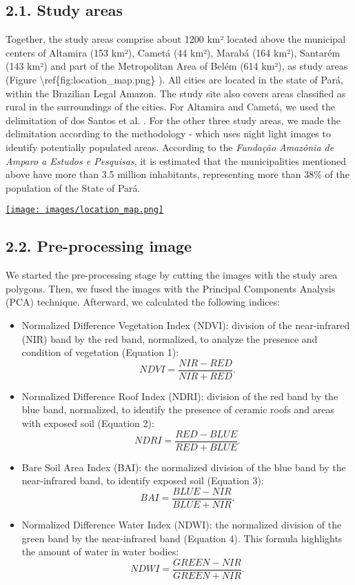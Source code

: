 \documentclass[preprint, 3p,
authoryear]{elsarticle} %
\providecommand{\tightlist}{%
  \setlength{\itemsep}{0pt}\setlength{\parskip}{0pt}}
\begin{document}
\hypertarget{study-areas}{%
\subsection{2.1. Study areas}\label{study-areas}}

Together, the study areas comprise about 1200 km² located above the
municipal centers of Altamira (153 km²), Cametá (44 km²), Marabá (164
km²), Santarém (143 km²) and part of the Metropolitan Area of Belém (614
km²), as study areas (Figure \textbackslash ref\{fig:location\_map.png\}
). All cities are located in the state of Pará, within the Brazilian
Legal Amazon. The study site also covers areas classified as rural in
the surroundings of the cities. For Altamira and Cametá, we used the
delimitation of dos Santos et al. \citeyearpar{Santos2022}. For the
other three study areas, we made the delimitation according to the
methodology \citep{Goncalves2021} - which uses night light images to
identify potentially populated areas. According to the \emph{Fundação
Amazônia de Amparo a Estudos e Pesquisas}, it is estimated that the
municipalities mentioned above have more than 3.5 million inhabitants,
representing more than 38\% of the population of the State of Pará.

\href{1}{\texttt{[image: images/location\_map.png]}}

\hypertarget{pre-processing-image}{%
\subsection{2.2. Pre-processing image}\label{pre-processing-image}}

We started the pre-processing stage by cutting the images with the study
area polygons. Then, we fused the images with the Principal Components
Analysis (PCA) technique. Afterward, we calculated the following
indices:

\begin{itemize}
\tightlist
\item
  Normalized Difference Vegetation Index (NDVI): division of the
  near-infrared (NIR) band by the red band, normalized, to analyze the
  presence and condition of vegetation (Equation 1): \[ 
  NDVI = \frac{NIR - RED}{NIR + RED}.
  \]
\item
  Normalized Difference Roof Index (NDRI): division of the red band by
  the blue band, normalized, to identify the presence of ceramic roofs
  and areas with exposed soil (Equation 2): \[ 
  NDRI = \frac{RED - BLUE}{RED + BLUE}.
  \]
\item
  Bare Soil Area Index (BAI): the normalized division of the blue band
  by the near-infrared band, to identify exposed soil (Equation 3): \[ 
  BAI = \frac{BLUE - NIR}{BLUE + NIR}.
  \]
\item
  Normalized Difference Water Index (NDWI): the normalized division of
  the green band by the near-infrared band (Equation 4). This formula
  highlights the amount of water in water bodies: \[ 
  NDWI = \frac{GREEN - NIR}{GREEN + NIR}.
  \]
\end{itemize}
\end{document}
